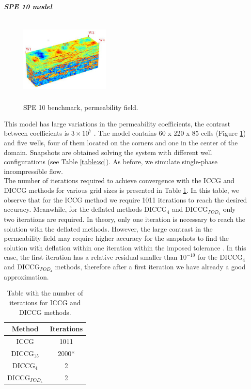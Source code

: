 \documentclass[review]{elsarticle}
\begin{document}
\emph{\textbf{SPE 10 model}}\\

\begin{figure}
\hspace{4mm}
 \centering
\includegraphics[width=4.5cm,height=4.5cm,keepaspectratio]
{images/perm85.jpg}
\caption{SPE 10 benchmark, permeability field.}
\label{fig:permcc}
\vspace{-10pt}

\end{figure}
This model has large variations in the permeability coefficients, the contrast between coefficients is $3\times 10^7$ \cite{Christie01}.
The model contains 60 x 220 x 85 cells (Figure \ref{fig:permcc}) and five wells, four of them located on the corners and one in the center of the domain.
Snapshots are obtained solving the system with different well
configurations (see Table \ref{table:sc}). As before, we simulate single-phase incompressible flow.\\
The number of iterations required to achieve convergence with the ICCG and DICCG methods for various grid sizes is presented in Table \ref{table:itgrid}. In this table, we observe that for the ICCG method we require 1011 iterations to reach the desired accuracy. Meanwhile, for the deflated methods DICCG$_4$ and DICCG$_{POD_4}$ only two iterations are required. In theory, only one iteration is necessary to reach the solution with the deflated methods. However, the large contrast in the permeability field may require higher accuracy for the snapshots to find the solution with deflation within one iteration within the imposed tolerance \cite{Diaz16}. In this case, the first iteration has a relative residual smaller than $10^{-10}$ for the DICCG$_4$ and DICCG$_{POD_4}$ methods, therefore after a first iteration we have already a good approximation.
\begin{table}[h!]
\centering
\begin{minipage}{.6\textwidth}
\centering
\begin{tabular}{|c | c| } 
 \hline
Method  &Iterations\\
   \hline
  ICCG &1011 \\ 
   DICCG$_{15}$ &  2000*\\ 
   DICCG$_{4}$ &  2\\  
   DICCG$_{POD_4}$  &2\\ 
\hline
\end{tabular}
\caption{Table with the number of iterations for ICCG and DICCG methods.}\label{table:itgrid}\end{minipage} 
\end{table}
\end{document}
